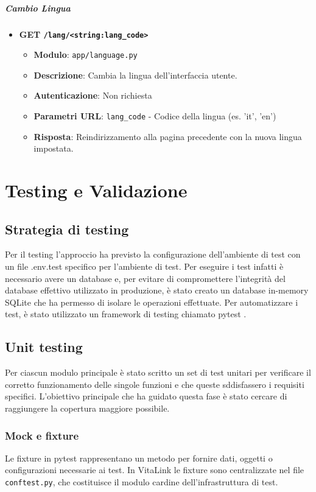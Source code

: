 \documentclass[12pt,a4paper,oneside]{report}
\begin{document}
\paragraph{Cambio Lingua}
\begin{itemize}
    \item \textbf{GET \texttt{/lang/<string:lang\_code>}}
          \begin{itemize}
              \item \textbf{Modulo}: \texttt{app/language.py}
              \item \textbf{Descrizione}: Cambia la lingua dell'interfaccia utente.
              \item \textbf{Autenticazione}: Non richiesta
              \item \textbf{Parametri URL}: \texttt{lang\_code} - Codice della lingua (es. 'it', 'en')
              \item \textbf{Risposta}: Reindirizzamento alla pagina precedente con la nuova lingua impostata.
          \end{itemize}
\end{itemize}


\chapter{Testing e Validazione}
\section{Strategia di testing}
Per il testing l'approccio ha previsto la configurazione dell'ambiente di test con un file .env.test specifico per l'ambiente di test.
Per eseguire i test infatti è necessario avere un database e, per evitare di compromettere l'integrità del database effettivo utilizzato in produzione, è stato creato un database in-memory SQLite che ha permesso di isolare le operazioni effettuate.
Per automatizzare i test, è stato utilizzato un framework di testing chiamato pytest \cite{pytest}.
\section{Unit testing}
Per ciascun modulo principale è stato scritto un set di test unitari per verificare il corretto funzionamento delle singole funzioni e che queste sddisfassero i requisiti specifici.
L'obiettivo principale che ha guidato questa fase è stato cercare di raggiungere la copertura maggiore possibile.
\subsection{Mock e fixture}
Le fixture in pytest rappresentano un metodo per fornire dati, oggetti o configurazioni necessarie ai test.
In VitaLink le fixture sono centralizzate nel file \texttt{conftest.py}, che costituisce il modulo cardine dell'infrastruttura di test.
\end{document}
